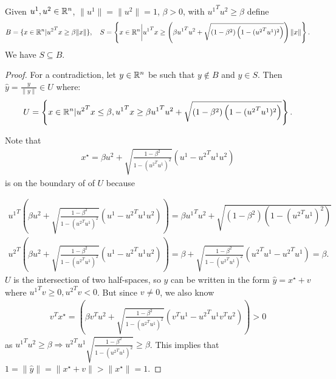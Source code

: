 \begin{theorem}
\label{cone_subset_cone}
Given $u^1, u^2 \in {\mathbb R^{n}}$, $\|u^1\| = \|u^2\|= 1$, $\beta >0$, with ${u^1}^Tu^2 \ge \beta$ define
\begin{align*}
B = \{x\in{\mathbb R^{n}} | {u^2}^Tx \ge \beta\|x\|\}, \quad
S = \left\{x\in{\mathbb R^{n}} \bigg| {u^1}^Tx \ge \left(\beta {u^1}^Tu^2 + \sqrt{(1 - \beta^2)\left(1 - ({u^2}^Tu^1)^2\right)}\right)\|x\| \right\}. 
\end{align*}
We have $S \subseteq B$.
\end{theorem}


\begin{proof}
For a contradiction, let $y \in {\mathbb R^{n}}$ be such that $y \not \in B$ and $y \in S$.
Then $\hat y = \frac{y}{\|y\|} \in U$ where:
\begin{align*}
U = \left\{x \in {\mathbb R^{n}} | {u^2}^Tx \le \beta, {u^1}^Tx \ge \beta {u^1}^Tu^2 + \sqrt{(1 - \beta^2)\left(1 - ({u^2}^Tu^1)^2\right)} \right\}.
\end{align*}

Note that
\begin{align*}
x^{\star} = \beta u^2 + \sqrt{\frac{1 - \beta^2}{1 - ({u^2}^Tu^1)^2}} (u^1 - {u^2}^Tu^1 u^2 )
\end{align*}
is on the boundary of of $U$ because

\begin{align*}
{u^1}^T\left(\beta u^2 + \sqrt{\frac{1 - \beta^2}{1 - ({u^2}^Tu^1)^2}} (u^1 - {u^2}^Tu^1 u^2 )\right) = 
\beta {u^1}^Tu^2 + \sqrt{(1 - \beta^2)\left(1 - ({u^2}^Tu^1)^2\right)} \\
{u^2}^T\left(\beta u^2 + \sqrt{\frac{1 - \beta^2}{1 - ({u^2}^Tu^1)^2}} (u^1 - {u^2}^Tu^1 u^2 )\right) = 
\beta + \sqrt{\frac{1 - \beta^2}{1 - ({u^2}^Tu^1)^2}} ({u^2}^Tu^1 - {u^2}^Tu^1 ) = \beta.
\end{align*}
$U$ is the intersection of two half-spaces, so $\hat y$ can be written in the form $\hat y = x^{\star} + v$ where ${u^1}^Tv \ge 0, {u^2}^Tv < 0$.
But since $v \ne 0$, we also know
\begin{align*}
{v}^Tx^{\star} = 
\left(\beta {v}^Tu^2 + \sqrt{\frac{1 - \beta^2}{1 - ({u^2}^Tu^1)^2}} ({v}^Tu^1 - {u^2}^Tu^1 {v}^Tu^2 )\right) > 0
\end{align*}
as ${u^1}^Tu^2 \ge \beta \Longrightarrow {u^2}^Tu^1\sqrt{\frac{1 - \beta^2}{1 - ({u^2}^Tu^1)^2}} \ge \beta$.
This implies that $1 = \|\hat y\| = \|x^{\star} + v\| > \|x^{\star}\| = 1$.
\end{proof}






